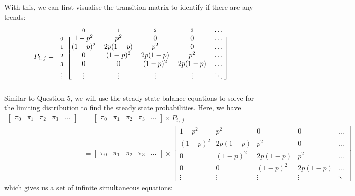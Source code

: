 \documentclass[12pt]{article}
\newcommand{\matindex}[1]{\mbox{\scriptsize#1}}%
\begin{document}
\noindent With this, we can first visualise the transition matrix to identify if there are any trends: \begin{align*}
    P_{i,\;j} = \begin{blockarray}{cccccc}
        & \matindex{0} & \matindex{1} & \matindex{2} & \matindex{3} & \dots \\ 
        \begin{block}{c[ccccc]}
            \matindex{0} & 1-p^{2} & p^{2} & 0 & 0 & \dots\\ 
            \matindex{1} & (1-p)^{2} & 2p(1-p) & p^{2} & 0 & \dots \\ 
            \matindex{2} & 0 & (1-p)^{2} & 2p(1-p) & p^{2} & \dots \\ 
            \matindex{3} & 0 & 0 & (1-p)^{2} & 2p(1-p) & \dots \\ 
            \matindex{\vdots} & \vdots & \vdots & \vdots & \vdots & \ddots \\ 
        \end{block}
    \end{blockarray}
\end{align*} Similar to Question 5, we will use the steady-state balance equations to solve for the limiting distribution to find the steady state probabilities. Here, we have \begin{align*}
    \begin{bmatrix}
        \pi_0 & \pi_1 & \pi_2 & \pi_3 & \dots
    \end{bmatrix} &= \begin{bmatrix}
        \pi_0 & \pi_1 & \pi_2 & \pi_3 & \dots
    \end{bmatrix} \times P_{i,\;j} \\ 
    &= \begin{bmatrix}
        \pi_0 & \pi_1 & \pi_2 & \pi_3 & \dots
    \end{bmatrix} \times \begin{bmatrix}
            1-p^{2} & p^{2} & 0 & 0 & \dots\\ 
            (1-p)^{2} & 2p(1-p) & p^{2} & 0 & \dots \\ 
            0 & (1-p)^{2} & 2p(1-p) & p^{2} & \dots \\ 
            0 & 0 & (1-p)^{2} & 2p(1-p) & \dots \\ 
            \vdots & \vdots & \vdots & \vdots & \ddots 
    \end{bmatrix}
\end{align*} which gives us a set of infinite simultaneous equations: \begin{align}\label{eq:6-pi0}

\end{align}
\end{document}
